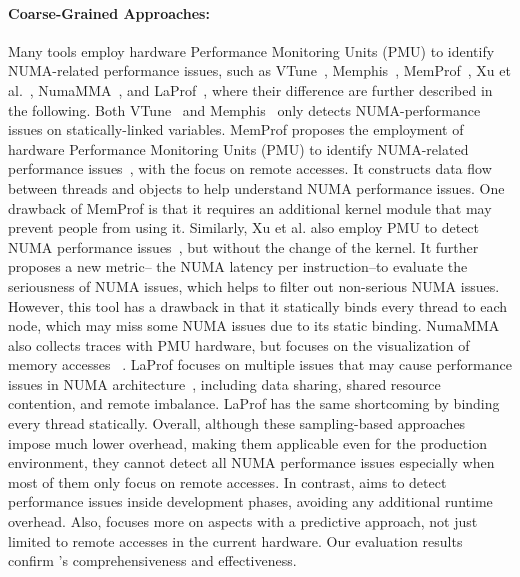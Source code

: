 \paragraph{Coarse-Grained Approaches:}
Many tools employ hardware Performance Monitoring Units (PMU) to identify NUMA-related performance issues, such as VTune~\cite{Intel:VTune}, Memphis~\cite{Memphis}, MemProf~\cite{Lachaize:2012:MMP:2342821.2342826}, Xu et al.~\cite{XuNuma}, NumaMMA~\cite{NumaMMA}, and LaProf~\cite{7847070}, where their difference are further described in the following. 
Both VTune~\cite{Intel:VTune} and Memphis~\cite{Memphis} only detects NUMA-performance issues on statically-linked variables.  
MemProf proposes the employment of hardware Performance Monitoring Units (PMU) to identify NUMA-related performance issues~\cite{Lachaize:2012:MMP:2342821.2342826}, with the focus on remote accesses. It constructs data flow between threads and objects to help understand NUMA performance issues. One drawback of MemProf is that it requires an additional kernel module that may prevent people from using it. Similarly, Xu et al. also employ PMU to detect NUMA performance issues~\cite{XuNuma}, but without the change of the kernel. It further proposes a new metric-- the NUMA latency per instruction--to evaluate the seriousness of NUMA issues, which helps to filter out non-serious NUMA issues. However, this tool has a drawback in that it statically binds every thread to each node, which may miss some NUMA issues due to its static binding. 
NumaMMA also collects traces with PMU hardware, but focuses on the visualization of memory accesses ~\cite{NumaMMA}. LaProf focuses on multiple issues that may cause performance issues in NUMA architecture~\cite{7847070}, including data sharing, shared resource contention, and remote imbalance. LaProf has the same shortcoming by binding every thread statically.  Overall, although these sampling-based approaches impose much lower overhead, making them applicable even for the production environment, they cannot detect all NUMA performance issues especially when most of them only focus on remote accesses. In contrast, \NP{} aims to detect performance issues inside  development phases, avoiding any additional runtime overhead. Also, \NP{} focuses more on aspects with a predictive approach, not just limited to remote accesses in the current hardware. Our evaluation results confirm \NP{}'s comprehensiveness and effectiveness. 

